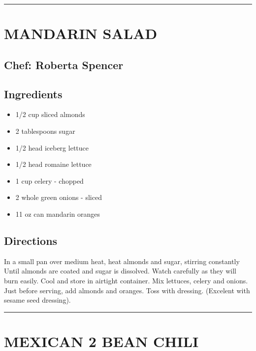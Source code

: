 \documentclass[
]{book}
\providecommand{\tightlist}{%
  \setlength{\itemsep}{0pt}\setlength{\parskip}{0pt}}
\begin{document}
\begin{center}\rule{0.5\linewidth}{0.5pt}\end{center}

\hypertarget{mandarin-salad}{%
\section*{MANDARIN SALAD}\label{mandarin-salad}}


\hypertarget{chef-roberta-spencer-3}{%
\subsection*{Chef: Roberta Spencer}\label{chef-roberta-spencer-3}}


\hypertarget{ingredients-20}{%
\subsection*{Ingredients}\label{ingredients-20}}


\begin{itemize}
\tightlist
\item
  1/2 cup sliced almonds
\item
  2 tablespoons sugar
\item
  1/2 head iceberg lettuce
\item
  1/2 head romaine lettuce
\item
  1 cup celery - chopped
\item
  2 whole green onions - sliced
\item
  11 oz can mandarin oranges
\end{itemize}

\hypertarget{directions-20}{%
\subsection*{Directions}\label{directions-20}}


In a small pan over medium heat, heat almonds and sugar, stirring constantly Until almonds are coated and sugar is dissolved. Watch carefully as they will burn easily. Cool and store in airtight container. Mix lettuces, celery and onions. Just before serving, add almonds and oranges. Toss with dressing. (Excelent with sesame seed dressing).

\begin{center}\rule{0.5\linewidth}{0.5pt}\end{center}

\hypertarget{mexican-2-bean-chili}{%
\section*{MEXICAN 2 BEAN CHILI}\label{mexican-2-bean-chili}}
\end{document}
